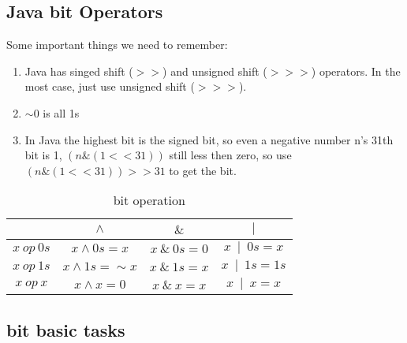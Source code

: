 \subsection{Java bit Operators  } 

Some important things we need to remember:
\begin{enumerate}
    \item   Java has singed shift (${>>}$) and unsigned shift  (${>>>}$) operators. In the most case, just use unsigned shift  (${>>>}$). 

    \item   ${\sim0}$ is all 1s 

    \item In Java the highest bit is the signed bit, so even a negative number n's 31th bit is 1, ${  ( n \& (1 << 31 ) )}$ still less then zero, so use ${  (  n \& (1 << 31 ) ) >> 31 }$ to get the bit. 

\end{enumerate}

\begin{table}[ht]
\caption{  bit operation } %
\centering %
\begin{tabular}{ | c | c | c | c  |  }
\hline
                         &  ${ \wedge  }$             &  ${ \&   }$       &  ${ \mid  }$       \\
 \hline
        ${x ~ op ~ 0s  }$    & ${x \wedge 0s =x}$         &  ${x~\&~0s =0}$   &  ${x~\mid~0s = x }$       \\
 \hline
        ${x ~ op ~ 1s  }$    & ${x \wedge 1s = \sim x}$   &  ${x~\&~1s =x}$   &  ${x~\mid~1s = 1s}$        \\
 \hline
        ${x ~ op  ~x  }$     & ${x \wedge x =0 }$         &  ${x~\&~x = x}$   &   ${x~\mid~x = x}$     \\
 \hline
        

\end{tabular}
\label{tab:bit_opt} %

\end{table}

\subsection{  bit basic tasks  } 

